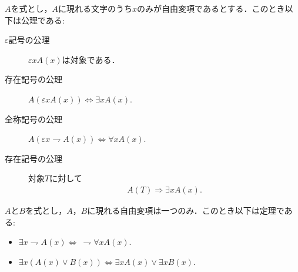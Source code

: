 	\begin{screen}
		$A$を式とし，$A$に現れる文字のうち$x$のみが自由変項であるとする．このとき以下は公理である:
		\begin{description}
			\item[$\varepsilon$記号の公理] $\varepsilon x A(x)$は対象である．
			\item[存在記号の公理] $A (\varepsilon x A(x)) \Longleftrightarrow \exists x A(x)$.
			\item[全称記号の公理] $A (\varepsilon x \rightharpoondown A(x)) \Longleftrightarrow \forall x A(x)$.
			\item[存在記号の公理] 対象$T$に対して
				\begin{align}
					A(T) \Longrightarrow \exists x A(x).
				\end{align}
		\end{description}
	\end{screen}
	
	\begin{screen}
		\begin{metathm}
			$A$と$B$を式とし，$A$，$B$に現れる自由変項は一つのみ．このとき以下は定理である:
			\begin{itemize}
				\item $\exists x \rightharpoondown A(x) \Longleftrightarrow\ \rightharpoondown \forall x A(x)$.
				\item $\exists x ( A(x) \vee B(x) ) \Longleftrightarrow \exists x A(x) \vee \exists x B(x)$.
			\end{itemize}
		\end{metathm}
	\end{screen}
	
